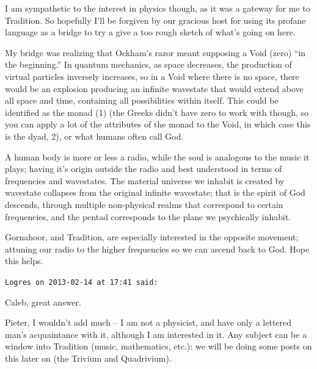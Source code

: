 \begin{footnotesize}
\begin{sffamily}
I am sympathetic to the interest in physics though, as it was a gateway for me to Tradition. So hopefully I'll be forgiven by our gracious host for using its profane language as a bridge to try a give a too rough sketch of what's going on here.

My bridge was realizing that Ockham's razor meant supposing a Void (zero) ``in the beginning.'' In quantum mechanics, as space decreases, the production of virtual particles inversely increases, so in a Void where there is no space, there would be an explosion producing an infinite wavestate that would extend above all space and time, containing all possibilities within itself. This could be identified as the monad (1) (the Greeks didn't have zero to work with though, so you can apply a lot of the attributes of the monad to the Void, in which case this is the dyad, 2), or what humans often call God.

A human body is more or less a radio, while the soul is analogous to the music it plays; having it's origin outside the radio and best understood in terms of frequencies and wavestates. The material universe we inhabit is created by wavestate collapses from the original infinite wavestate; that is the spirit of God descends, through multiple non-physical realms that correspond to certain frequencies, and the pentad corresponds to the plane we psychically inhabit.

Gornahoor, and Tradition, are especially interested in the opposite movement; attuning our radio to the higher frequencies so we can ascend back to God. Hope this helps.

\hfill

\texttt{Logres on 2013-02-14 at 17:41 said:}

Caleb, great answer.

Pieter, I wouldn't add much -- I am not a physicist, and have only a lettered man's acquaintance with it, although I am interested in it. Any subject can be a window into Tradition (music, mathematics, etc.): we will be doing some posts on this later on (the Trivium and Quadrivium).


\end{sffamily}
\end{footnotesize}
